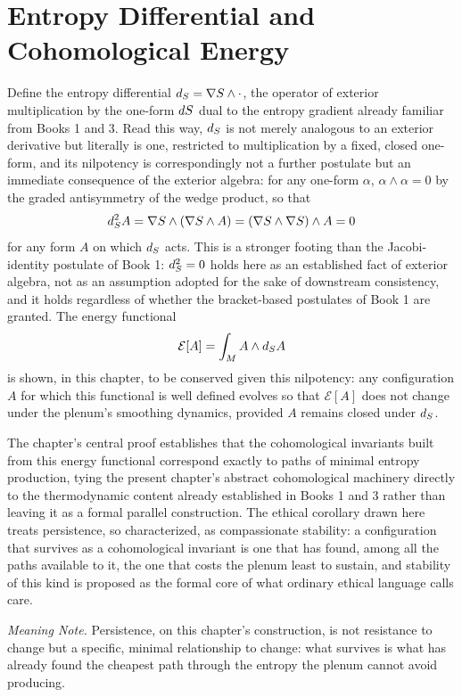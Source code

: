 \chapter{Entropy Differential and Cohomological Energy}

Define the entropy differential $d_{S} = \nabla S \wedge \cdot$, the operator of exterior multiplication by the one-form $dS$ dual to the entropy gradient already familiar from Books 1 and 3. Read this way, $d_{S}$ is not merely analogous to an exterior derivative but literally is one, restricted to multiplication by a fixed, closed one-form, and its nilpotency is correspondingly not a further postulate but an immediate consequence of the exterior algebra: for any one-form $\alpha$, $\alpha \wedge \alpha = 0$ by the graded antisymmetry of the wedge product, so that
\[
d_{S}^2 A = \nabla S \wedge (\nabla S \wedge A) = (\nabla S \wedge \nabla S) \wedge A = 0
\]
for any form $A$ on which $d_{S}$ acts. This is a stronger footing than the Jacobi-identity postulate of Book 1: $d_{S}^2 = 0$ holds here as an established fact of exterior algebra, not as an assumption adopted for the sake of downstream consistency, and it holds regardless of whether the bracket-based postulates of Book 1 are granted. The energy functional
\[
\mathcal{E}[A] = \int_M A \wedge d_{S} A
\]
is shown, in this chapter, to be conserved given this nilpotency: any configuration $A$ for which this functional is well defined evolves so that $\mathcal{E}[A]$ does not change under the plenum's smoothing dynamics, provided $A$ remains closed under $d_{S}$.

The chapter's central proof establishes that the cohomological invariants built from this energy functional correspond exactly to paths of minimal entropy production, tying the present chapter's abstract cohomological machinery directly to the thermodynamic content already established in Books 1 and 3 rather than leaving it as a formal parallel construction. The ethical corollary drawn here treats persistence, so characterized, as compassionate stability: a configuration that survives as a cohomological invariant is one that has found, among all the paths available to it, the one that costs the plenum least to sustain, and stability of this kind is proposed as the formal core of what ordinary ethical language calls care.

\emph{Meaning Note.} Persistence, on this chapter's construction, is not resistance to change but a specific, minimal relationship to change: what survives is what has already found the cheapest path through the entropy the plenum cannot avoid producing.

